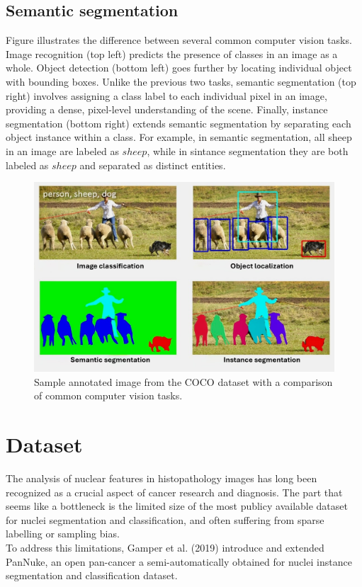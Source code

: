 \documentclass[target=bach,aauheader=,style=]{thud}
\begin{document}
\section{Semantic segmentation}
Figure\cite{fig:semantic} illustrates the difference between several common computer vision tasks. Image recognition (top left) predicts the presence of classes in an image as a whole. Object detection (bottom left) goes further by locating individual object with bounding boxes. Unlike the previous two tasks, semantic segmentation (top right) involves assigning a class label to each individual pixel in an image, providing a dense, pixel-level understanding of the scene. Finally, instance segmentation (bottom right) extends semantic segmentation by separating each object instance within a class. For example, in semantic segmentation, all sheep in an image are labeled as $sheep$, while in sintance segmentation they are both labeled as $sheep$ and separated as distinct entities.
\begin{figure}[h]
    \centering
    \includegraphics[width=\linewidth]{imgs/Instance segmentation.png}
    \caption{Sample annotated image from the COCO \cite{lin2015microsoftcococommonobjects} dataset with a comparison of common computer vision tasks.}
\end{figure}
\chapter{Dataset}
\label{sec:dataset}
The analysis of nuclear features in histopathology images has long been recognized as a crucial aspect of cancer research and diagnosis. The part that seems like a bottleneck is the limited size of the most publicy available dataset for nuclei segmentation and classification, and often suffering from sparse labelling or sampling bias.\\
To address this limitations, Gamper et al. (2019) 
\cite{gamper2019pannuke,gamper2020pannuke} introduce and extended PanNuke, an open pan-cancer a semi-automatically obtained for nuclei instance segmentation and classification dataset.
\end{document}
